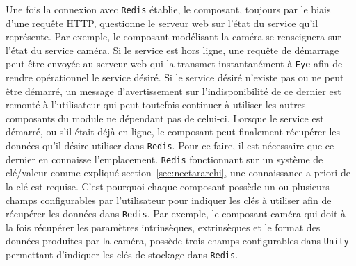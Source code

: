 Une fois la connexion avec \texttt{Redis} établie, le composant, toujours par le biais d'une requête HTTP, questionne le serveur web sur l'état du service qu'il représente. Par exemple, le composant modélisant la caméra se renseignera sur l'état du service caméra. Si le service est hors ligne, une requête de démarrage peut être envoyée au serveur web qui la transmet instantanément à \texttt{Eye} afin de rendre opérationnel le service désiré. Si le service désiré n'existe pas ou ne peut être démarré, un message d'avertissement sur l'indisponibilité de ce dernier est remonté à l'utilisateur qui peut toutefois continuer à utiliser les autres composants du module ne dépendant pas de celui-ci. 
Lorsque le service est démarré, ou s'il était déjà en ligne, le composant peut finalement récupérer les données qu'il désire utiliser dans \texttt{Redis}. Pour ce faire, il est nécessaire que ce dernier en connaisse l'emplacement. \texttt{Redis} fonctionnant sur un système de clé/valeur comme expliqué section~\ref{sec:nectararchi}, une connaissance a priori de la clé est requise. C'est pourquoi chaque composant possède un ou plusieurs champs configurables par l'utilisateur pour indiquer les clés à utiliser afin de récupérer les données dans \texttt{Redis}. Par exemple, le composant caméra qui doit à la fois récupérer les paramètres intrinsèques, extrinsèques et le format des données produites par la caméra, possède trois champs configurables dans \texttt{Unity} permettant d'indiquer les clés de stockage dans \texttt{Redis}.\\

